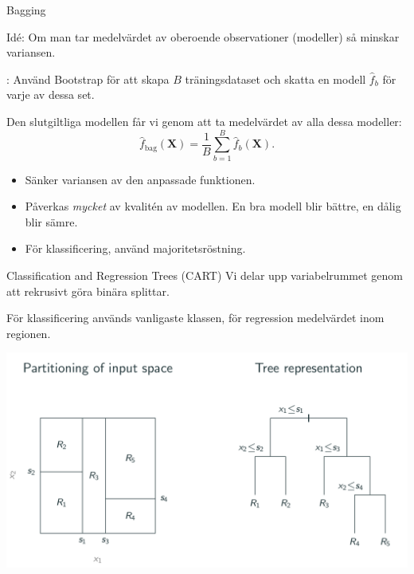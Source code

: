 \documentclass[10pt,english]{beamer}
\begin{document}
\begin{frame}{Bagging}
    
    Idé: Om man tar medelvärdet av oberoende observationer (modeller) så minskar variansen.

    \begin{bluebox}
        : Använd Bootstrap för att skapa $B$ träningsdataset och skatta en modell $\hat{f}_b$ för varje av dessa set.

        Den slutgiltliga modellen får vi genom att ta medelvärdet av alla dessa modeller:
        \begin{equation*}
            \hat{f}_{\text{bag}}(\mathbf{X}) = \frac{1}{B}\sum_{b=1}^{B}\hat{f}_b(\mathbf{X}).
        \end{equation*}
    \end{bluebox}

    \begin{itemize}
        \item Sänker variansen av den anpassade funktionen.
        \item Påverkas \emph{mycket} av kvalitén av modellen. En bra modell blir bättre, en dålig blir sämre.
        \item För klassificering, använd majoritetsröstning.
    \end{itemize}

\end{frame}

\begin{frame}{Classification and Regression Trees (CART)}
    Vi delar upp variabelrummet genom att rekrusivt göra binära splittar.

    För klassificering används vanligaste klassen, för regression medelvärdet inom regionen.

    \includegraphics[width=\textwidth]{figs/tree_fredrik.png}
\end{frame}
\end{document}
